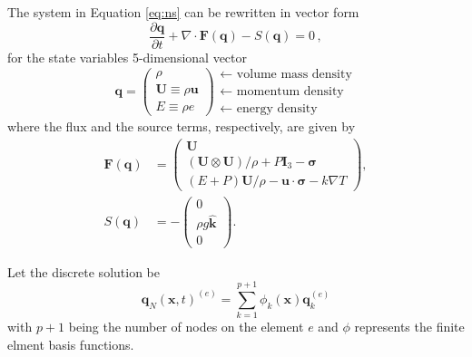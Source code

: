 The system in Equation \ref{eq:ns} can be rewritten in vector form
\begin{equation}
   \frac{\partial \mathbf{q}}{\partial t} + \nabla \cdot \mathbf{F}(\mathbf{q}) -S(\mathbf{q}) = 0 \, ,
\label{eq:vector-ns}
\end{equation}
for the state variables 5-dimensional vector
\begin{equation}
    \mathbf{q} =
           \begin{pmatrix}
               \rho \\
               \mathbf{U} \equiv \rho \mathbf{u}\\
               E \equiv \rho e
           \end{pmatrix}
           \begin{array}{l}
               \leftarrow\textrm{ volume mass density}\\
               \leftarrow\textrm{ momentum density}\\
               \leftarrow\textrm{ energy density}
           \end{array}
\end{equation}
where the flux and the source terms, respectively, are given by
\begin{equation}
    \begin{aligned}
    \mathbf{F}(\mathbf{q}) &=
    \begin{pmatrix}
        \mathbf{U}\\
        {(\mathbf{U} \otimes \mathbf{U})}/{\rho} + P \mathbf{I}_3 -  \boldsymbol{\sigma} \\
        {(E + P)\mathbf{U}}/{\rho} - \mathbf{u}  \cdot \boldsymbol{\sigma} - k \nabla T
    \end{pmatrix} ,\\
    S(\mathbf{q}) &=
    - \begin{pmatrix}
        0\\
        \rho g \mathbf{\hat{k}}\\
        0
    \end{pmatrix}.
    \end{aligned}
\end{equation}

Let the discrete solution be
\begin{equation}
   \mathbf{q}_N (\mathbf{x},t)^{(e)} = \sum_{k = 1}^{p + 1}\phi_k (\mathbf{x})\mathbf{q}_k^{(e)}
\end{equation}
with $p + 1$ being the number of nodes on the element $e$ and $\phi$ represents the finite elment basis functions.

